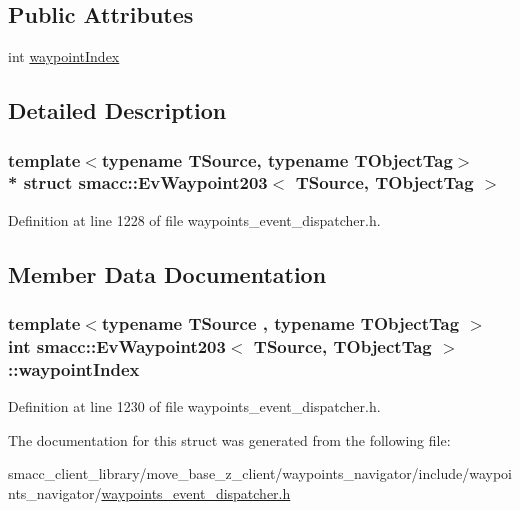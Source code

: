\subsection*{Public Attributes}
\begin{DoxyCompactItemize}
\item 
int \hyperlink{structsmacc_1_1EvWaypoint203_a0050d44205b79f6909640f0810abc80d}{waypoint\+Index}
\end{DoxyCompactItemize}


\subsection{Detailed Description}
\subsubsection*{template$<$typename T\+Source, typename T\+Object\+Tag$>$\\*
struct smacc\+::\+Ev\+Waypoint203$<$ T\+Source, T\+Object\+Tag $>$}



Definition at line 1228 of file waypoints\+\_\+event\+\_\+dispatcher.\+h.



\subsection{Member Data Documentation}
\subsubsection[{\texorpdfstring{waypoint\+Index}{waypointIndex}}]{\setlength{\rightskip}{0pt plus 5cm}template$<$typename T\+Source , typename T\+Object\+Tag $>$ int {\bf smacc\+::\+Ev\+Waypoint203}$<$ T\+Source, T\+Object\+Tag $>$\+::waypoint\+Index}\hypertarget{structsmacc_1_1EvWaypoint203_a0050d44205b79f6909640f0810abc80d}{}\label{structsmacc_1_1EvWaypoint203_a0050d44205b79f6909640f0810abc80d}


Definition at line 1230 of file waypoints\+\_\+event\+\_\+dispatcher.\+h.



The documentation for this struct was generated from the following file\+:\begin{DoxyCompactItemize}
\item 
smacc\+\_\+client\+\_\+library/move\+\_\+base\+\_\+z\+\_\+client/waypoints\+\_\+navigator/include/waypoints\+\_\+navigator/\hyperlink{waypoints__event__dispatcher_8h}{waypoints\+\_\+event\+\_\+dispatcher.\+h}\end{DoxyCompactItemize}
